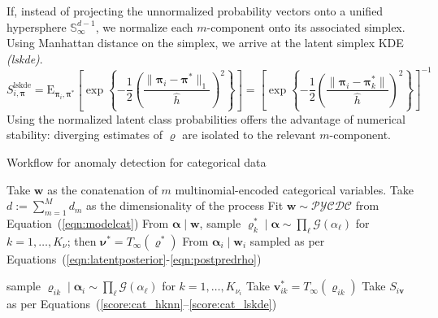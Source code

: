 If, instead of projecting the unnormalized probability vectors onto a unified 
    hypersphere $\mathbb{S}_{\infty}^{d-1}$, we normalize each $m$-component 
    onto its associated simplex.  Using Manhattan distance on the simplex, we 
    arrive at the latent simplex KDE \emph{(lskde)}.
    \begin{equation}
        \label{score:cat_lskde}
        S_{i,\bm{\pi}}^{\text{lskde}} = \text{E}_{\bm{\pi}_i,\bm{\pi}^*}\left[\exp\left\lbrace
        -\frac{1}{2}\left(
        \frac{\lVert \bm{\pi}_i - \bm{\pi}^*\rVert_1}{\hat{h}}
        \right)^2
        \right\rbrace
        \right]
        = \left[
            \exp\left\lbrace
            -\frac{1}{2}\left(\frac{\lVert \bm{\pi}_i - \bm{\pi}_k^*\rVert}{\hat{h}}\right)^2
            \right\rbrace
        \right]^{-1}
    \end{equation}
    Using the normalized latent class probabilities offers the advantage of
    numerical stability: diverging estimates of $\varrho$ are isolated to the
    relevant $m$-component.

\begin{algorithm}[htb]
    \caption{Workflow for anomaly detection for categorical data}\label{alg:adcat}
    \begin{algorithmic}[1]
        \State Take $\bm{w}$ as the conatenation of $m$ multinomial-encoded categorical variables.
        \State Take $d := \sum_{m = 1}^M d_m$ as the dimensionality of the process
        \State Fit $\bm{w}\sim\mathcal{PYCDC}$ from Equation~(\ref{eqn:modelcat})
        \State From $\bm{\alpha}\mid\bm{w}$, sample $\bm{\varrho}_k^*\mid\bm{\alpha}\sim \prod_{\ell}\mathcal{G}(\alpha_{\ell})$ for $k = 1,\ldots,K_{\nu}$; then $\bm{\nu}^* = T_{\infty}(\bm{\varrho}^*)$
        \State From $\bm{\alpha}_i\mid\bm{w}_i$ sampled as per Equations~(\ref{eqn:latentposterior}-\ref{eqn:postpredrho})
        
        sample $\bm{\varrho}_{ik}\mid\bm{\alpha}_{i}\sim\prod_{\ell}\mathcal{G}(\alpha_{\ell})$ for $k = 1,\ldots,K_{\nu_i}$
        \State Take $\bm{v}_{ik}^{*} = T_{\infty}(\bm{\varrho}_{ik})$
        \State Take $S_{i\bm{v}}$ as per Equations~(\ref{score:cat_hknn}--\ref{score:cat_lskde})
    \end{algorithmic}
\end{algorithm}




